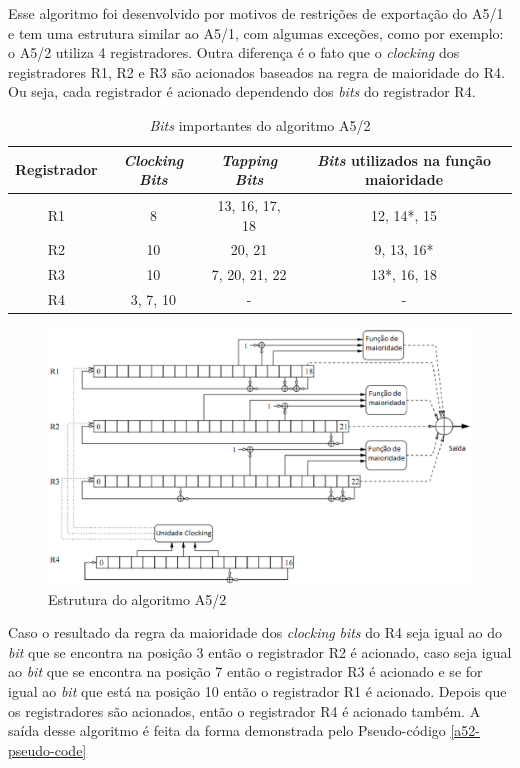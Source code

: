 Esse algoritmo foi desenvolvido por motivos de restrições de exportação do A5/1 e tem uma estrutura similar ao A5/1, com algumas exceções, como por exemplo: o A5/2 utiliza 4 registradores. Outra diferença é o fato que o \textit{clocking} dos registradores R1, R2 e R3 são acionados baseados na regra de maioridade do R4. Ou seja, cada registrador é acionado dependendo dos \textit{bits} do registrador R4. 

\begin{table}[h]
\centering
	\begin{tabular}{c c c c}
	\toprule
	Registrador & \textit{Clocking Bits} & \textit{Tapping Bits} & \textit{Bits} utilizados na função maioridade \\ \hline
		R1 & 8 & 13, 16, 17, 18  & 12, 14*\protect\footnotemark , 15\\ \hline
		R2 & 10 & 20, 21 & 9, 13, 16*\\ \hline
		R3 & 10 & 7, 20, 21, 22 & 13*, 16, 18\\ \hline	
		R4 & 3, 7, 10 & - & -\\ \hline
	\end{tabular}
	\caption{\textit{Bits} importantes do algoritmo A5/2}
\end{table}
\begin{figure}[h]
\centering
\includegraphics[keepaspectratio=true,scale=0.5]
    {figuras/a5_2.eps}
    \caption[Estrutura do algoritmo A5/2]{Estrutura do algoritmo A5/2\protect\footnotemark } 
\end{figure}

Caso o resultado da regra da maioridade dos \textit{clocking} \textit{bits} do R4 seja igual ao do \textit{bit} que se encontra na posição 3 então o registrador R2 é acionado, caso seja igual ao \textit{bit} que se encontra na posição 7 então o registrador R3 é acionado e se for igual ao \textit{bit} que está na posição 10 então o registrador R1 é acionado. Depois que os registradores são acionados, então o registrador R4 é acionado também. A saída desse algoritmo é feita da forma demonstrada pelo Pseudo-código \ref{a52-pseudo-code}

